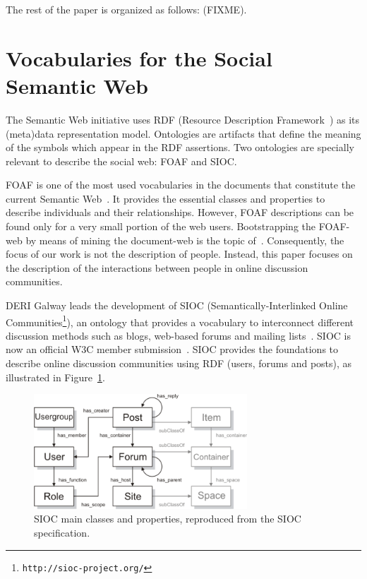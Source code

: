 \documentclass{../templates/www2008-submission}
\begin{document}
The rest of the paper is organized as follows: (FIXME).

\section{Vocabularies for the Social Semantic Web}

The Semantic Web initiative uses RDF (Resource Description
Framework~\cite{RDF}) as its (meta)data representation model.
Ontologies are artifacts that define the meaning of the symbols
which appear in the RDF assertions. Two ontologies are
specially relevant to describe the social web: FOAF and SIOC.

FOAF is one of the most used vocabularies in the documents that
constitute the current Semantic Web~\cite{Ding2005, Finin2005}.
It provides the essential classes and properties to describe individuals
and their relationships. However, FOAF descriptions can be found
only for a very small portion of the web users. Bootstrapping the
FOAF-web by means of mining the document-web is the topic
of~\cite{Mika2004}. Consequently, the focus of our work is not the
description of people. Instead, this paper focuses on the description
of the interactions between people in online discussion communities.

DERI Galway leads the development of SIOC (Semantically-Interlinked Online
Communities\footnote{\texttt{http://sioc-project.org/}}), an ontology that 
provides a vocabulary to interconnect different discussion methods such 
as blogs, web-based forums and mailing lists~\cite{Breslin2006,Breslin2005}.
SIOC is now an official W3C member submission~\cite{Bojars2007}.
SIOC provides the foundations to describe online discussion
communities using RDF (users, forums and posts), as illustrated in
Figure~\ref{fig:sioc}.

\begin{figure}[ht]
 \centering
 \includegraphics[width=8cm]{images/sioc.png}
 \caption{\label{fig:sioc}SIOC main classes and properties, reproduced from the SIOC specification.}
\end{figure}
\end{document}
